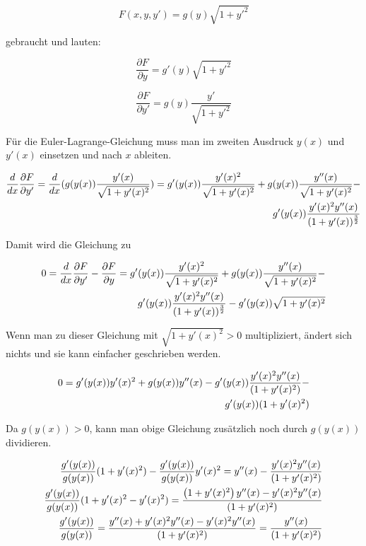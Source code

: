 \begin{equation}
F(x,y,y') = g(y) \sqrt{1 + y'^2}
\end{equation}

gebraucht und lauten:

\begin{equation}
\frac{\partial F}{\partial y} = g'(y) \sqrt{1 + y'^2}
\end{equation}

\begin{equation}
\frac{\partial F}{\partial y'} = g(y) \frac{y'}{\sqrt{1 + y'^2}}
\end{equation}

Für die Euler-Lagrange-Gleichung muss man im zweiten Ausdruck $y(x)$ 
und $y'(x)$ einsetzen und nach $x$ ableiten.

\begin{align}
\frac{d}{dx} \frac{\partial F}{\partial y'} = \frac{d}{dx} (g(y(x)) \frac{y'(x)}{\sqrt{1 + y'(x)^2}})
 = g'(y(x)) \frac{y'(x)^2}{\sqrt{1 + y'(x)^2}} + g(y(x)) \frac{y''(x)}{\sqrt{1 + y'(x)^2}} - \notag \\
g'(y(x)) \frac{y'(x)^2 y''(x)}{(1 + y'(x))^\frac{3}{2}}
\end{align}

Damit wird die Gleichung zu

\begin{align}
0 = \frac{d}{dx} \frac{\partial F}{\partial y'} - \frac{\partial F}{\partial y} = 
g'(y(x)) \frac{y'(x)^2}{\sqrt{1 + y'(x)^2}} + g(y(x)) \frac{y''(x)}{\sqrt{1 + y'(x)^2}} - \notag \\
g'(y(x)) \frac{y'(x)^2 y''(x)}{(1 + y'(x))^\frac{3}{2}}  - g'(y(x)) \sqrt{1 + y'(x)^2}
\end{align}

Wenn man zu dieser Gleichung mit $\sqrt{1 + y'(x)^2} > 0$ multipliziert, 
ändert sich nichts und sie kann einfacher geschrieben werden.

\begin{align}
0 = g'(y(x)) y'(x)^2 + g(y(x)) y''(x) - g'(y(x)) \frac{y'(x)^2 y''(x)}{(1 + y'(x)^2)} - \notag \\ g'(y(x)) (1 + y'(x)^2)
\end{align}

Da $g(y(x)) > 0$, kann man obige Gleichung zusätzlich noch durch $g(y(x))$ dividieren.

\begin{align}
\frac{g'(y(x))}{g(y(x))} (1 + y'(x)^2) - \frac{g'(y(x))}{g(y(x))} y'(x)^2 =  y''(x) - \frac{y'(x)^2 y''(x)}{(1 + y'(x)^2)} \notag \\
\frac{g'(y(x))}{g(y(x))} (1 + y'(x)^2 - y'(x)^2) = \frac{\left(1 + y'(x)^2 \right)y''(x) - y'(x)^2 y''(x)}{(1 + y'(x)^2)} \notag \\
\frac{g'(y(x))}{g(y(x))} = \frac{y''(x) + y'(x)^2 y''(x) - y'(x)^2 y''(x)}{(1 + y'(x)^2)} = \frac{y''(x)}{(1 + y'(x)^2)}
\end{align}

